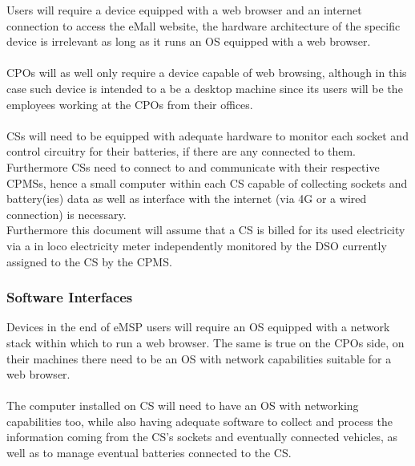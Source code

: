\documentclass[11pt]{article}
\begin{document}
Users will require a device equipped with a web browser and an internet connection to access the eMall website, the hardware architecture of the specific device is irrelevant as long as it runs an OS equipped with a web browser. \\
\\
CPOs will as well only require a device capable of web browsing, although in this case such device is intended to a be a desktop machine since its users will be the employees working at the CPOs from their offices. \\
\\
CSs will need to be equipped with adequate hardware to monitor each socket and control circuitry for their batteries, if there are any connected to them. Furthermore CSs need to connect to and communicate with their respective CPMSs, hence a small computer within each CS capable of collecting sockets and battery(ies) data as well as interface with the internet (via 4G or a wired connection) is necessary. \\
Furthermore this document will assume that a CS is billed for its used electricity via a in loco electricity meter independently monitored by the DSO currently assigned to the CS by the CPMS.

\subsubsection{Software Interfaces}

Devices in the end of eMSP users will require an OS equipped with a network stack within which to run a web browser. The same is true on the CPOs side, on their machines there need to be an OS with network capabilities suitable for a web browser. \\
\\
The computer installed on CS will need to have an OS with networking capabilities too, while also having adequate software to collect and process the information coming from the CS's sockets and eventually connected vehicles, as well as to manage eventual batteries connected to the CS.

\end{document}
